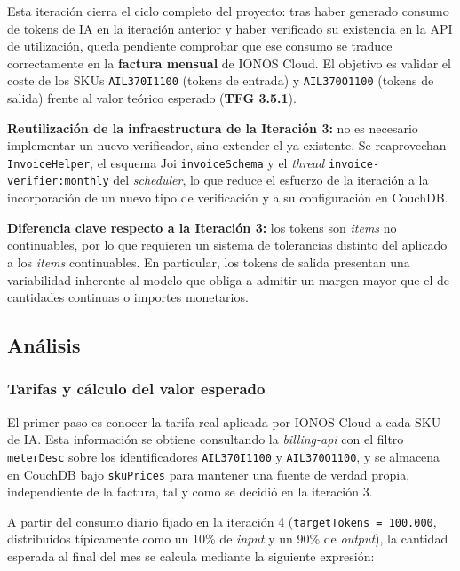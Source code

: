 Esta iteración cierra el ciclo completo del proyecto: tras haber generado consumo de tokens de IA en la iteración anterior y haber verificado su existencia en la API de utilización, queda pendiente comprobar que ese consumo se traduce correctamente en la \textbf{factura mensual} de IONOS Cloud. El objetivo es validar el coste de los SKUs \texttt{AIL370I1100} (tokens de entrada) y \texttt{AIL370O1100} (tokens de salida) frente al valor teórico esperado (\textbf{TFG 3.5.1}).

\textbf{Reutilización de la infraestructura de la Iteración 3:} no es necesario implementar un nuevo verificador, sino extender el ya existente. Se reaprovechan \texttt{InvoiceHelper}, el esquema Joi \texttt{invoiceSchema} y el \textit{thread} \texttt{invoice-verifier:monthly} del \textit{scheduler}, lo que reduce el esfuerzo de la iteración a la incorporación de un nuevo tipo de verificación y a su configuración en CouchDB.

\textbf{Diferencia clave respecto a la Iteración 3:} los tokens son \textit{items} no continuables, por lo que requieren un sistema de tolerancias distinto del aplicado a los \textit{items} continuables. En particular, los tokens de salida presentan una variabilidad inherente al modelo que obliga a admitir un margen mayor que el de cantidades continuas o importes monetarios.

\subsection{Análisis}

\subsubsection{Tarifas y cálculo del valor esperado}

El primer paso es conocer la tarifa real aplicada por IONOS Cloud a cada SKU de IA. Esta información se obtiene consultando la \textit{billing-api} con el filtro \texttt{meterDesc} sobre los identificadores \texttt{AIL370I1100} y \texttt{AIL370O1100}, y se almacena en CouchDB bajo \texttt{skuPrices} para mantener una fuente de verdad propia, independiente de la factura, tal y como se decidió en la iteración 3.

A partir del consumo diario fijado en la iteración 4 (\texttt{targetTokens = 100.000}, distribuidos típicamente como un 10\% de \textit{input} y un 90\% de \textit{output}), la cantidad esperada al final del mes se calcula mediante la siguiente expresión:

